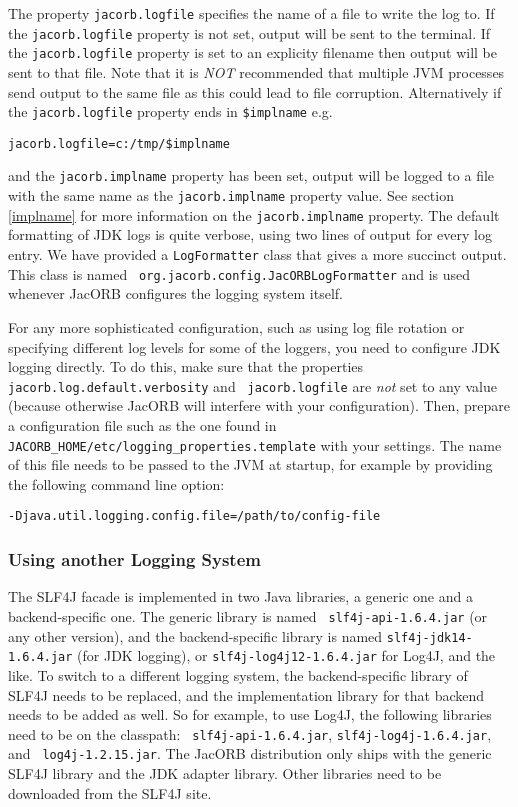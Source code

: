 The property {\tt jacorb.logfile} specifies the name of a file to
write the log to.  If the {\tt jacorb.logfile} property is not set, output
will be sent to the terminal.
If the {\tt jacorb.logfile} property is set to an explicity filename then
output will be sent to that file. Note that it is \emph{NOT} recommended that
multiple JVM processes send output to the same file as this could lead to file
corruption. Alternatively if the {\tt jacorb.logfile} property ends in
{\tt \$implname} e.g.
\small{
\begin{verbatim}
jacorb.logfile=c:/tmp/$implname
\end{verbatim}
}
\small\normalsize
and the {\tt jacorb.implname} property has been set, output will be logged
to a file with the same name as the {\tt jacorb.implname} property value. See
section \ref{implname} for more information on the {\tt jacorb.implname} property.
The default formatting of JDK logs is quite verbose, using two lines
of output for every log entry.  We have provided a {\tt LogFormatter}
class that gives a more succinct output.  This class is named {\tt
  org.jacorb.config.JacORBLogFormatter} and is used whenever JacORB
configures the logging system itself.

For any more sophisticated configuration, such as using log file
rotation or specifying different log levels for some of the loggers,
you need to configure JDK logging directly.  To do this, make sure
that the properties {\tt jacorb.log.default.verbosity} and {\tt
  jacorb.logfile} are \emph{not} set to any value (because otherwise
JacORB will interfere with your configuration).  Then, prepare a
configuration file such as the one found in {\tt
  JACORB\_HOME/etc/logging\_properties.template} with your settings.
The name of this file needs to be passed to the JVM at startup, for
example by providing the following command line option:

\begin{verbatim}
-Djava.util.logging.config.file=/path/to/config-file
\end{verbatim}

\subsubsection{Using another Logging System}

The SLF4J facade is implemented in two Java libraries, a generic one
and a backend-specific one.  The generic library is named {\tt
  slf4j-api-1.6.4.jar} (or any other version), and the
backend-specific library is named {\tt slf4j-jdk14-1.6.4.jar} (for JDK
logging), or {\tt slf4j-log4j12-1.6.4.jar} for Log4J, and the like.  To
switch to a different logging system, the backend-specific library of
SLF4J needs to be replaced, and the implementation library for that
backend needs to be added as well.  So for example, to use Log4J, the
following libraries need to be on the classpath: {\tt
  slf4j-api-1.6.4.jar}, {\tt slf4j-log4j-1.6.4.jar}, and {\tt
  log4j-1.2.15.jar}.  The JacORB distribution only ships with the
generic SLF4J library and the JDK adapter library.  Other libraries
need to be downloaded from the SLF4J site.

